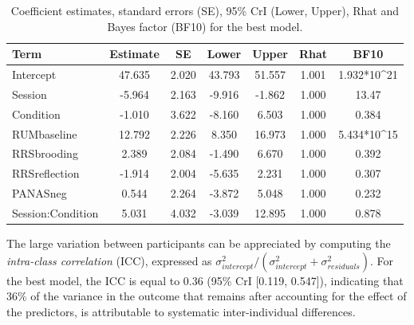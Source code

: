 \documentclass[a4paper,12pt,twoside,onecolumn,openright,final,oldfontcommands]{memoir}
\begin{document}
\begin{table}[H]
\begin{center}
\begin{threeparttable}
\caption{\label{tab:paramexp2}Coefficient estimates, standard errors (SE), 95\% CrI (Lower, Upper), Rhat and Bayes factor (BF10) for the best model.}
\small{
\begin{tabular}{lcccccc}
\toprule
Term & \multicolumn{1}{c}{Estimate} & \multicolumn{1}{c}{SE} & \multicolumn{1}{c}{Lower} & \multicolumn{1}{c}{Upper} & \multicolumn{1}{c}{Rhat} & \multicolumn{1}{c}{BF10}\\
\midrule
Intercept & 47.635 & 2.020 & 43.793 & 51.557 & 1.001 & 1.932*10\textasciicircum{}21\\
Session & -5.964 & 2.163 & -9.916 & -1.862 & 1.000 & 13.47\\
Condition & -1.010 & 3.622 & -8.160 & 6.503 & 1.000 & 0.384\\
RUMbaseline & 12.792 & 2.226 & 8.350 & 16.973 & 1.000 & 5.434*10\textasciicircum{}15\\
RRSbrooding & 2.389 & 2.084 & -1.490 & 6.670 & 1.000 & 0.392\\
RRSreflection & -1.914 & 2.004 & -5.635 & 2.231 & 1.000 & 0.307\\
PANASneg & 0.544 & 2.264 & -3.872 & 5.048 & 1.000 & 0.232\\
Session:Condition & 5.031 & 4.032 & -3.039 & 12.895 & 1.000 & 0.878\\
\bottomrule
\end{tabular}
}
\end{threeparttable}
\end{center}
\end{table}

The large variation between participants can be appreciated by computing the \emph{intra-class correlation} (ICC), expressed as \(\sigma_{intercept}^{2}/(\sigma_{intercept}^{2}+\sigma_{residuals}^{2})\). For the best model, the ICC is equal to 0.36 (95\% CrI {[}0.119, 0.547{]}), indicating that 36\% of the variance in the outcome that remains after accounting for the effect of the predictors, is attributable to systematic inter-individual differences.
\end{document}
